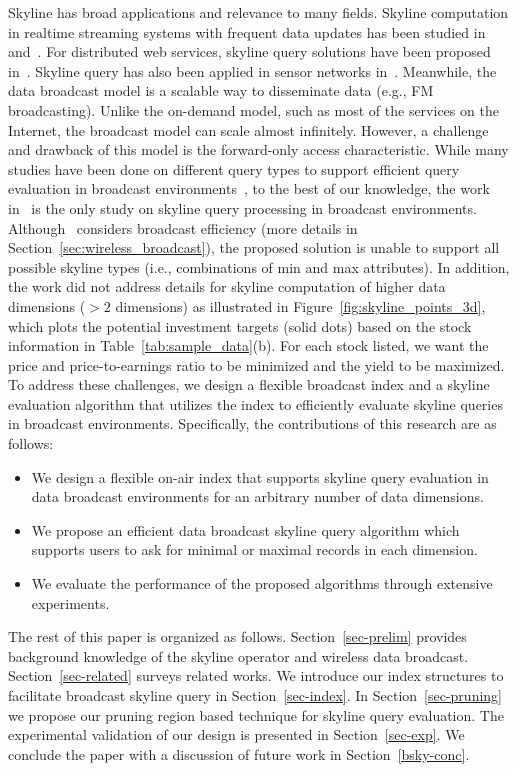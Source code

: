 Skyline has broad applications and relevance to many fields.
Skyline computation in realtime streaming systems with frequent
data updates has been studied in~\cite{conf/icde/LinYWL05}
and~\cite{journals/tkde/TaoP06}. For distributed web services,
skyline query solutions have been proposed
in~\cite{conf/edbt/BalkeGZ04}. Skyline query has also been applied
in sensor networks in~\cite{conf/cikm/ChenLY09}. Meanwhile, the
data broadcast model is a scalable way to disseminate data (e.g.,
FM broadcasting). Unlike the on-demand model, such as most of the
services on the Internet, the broadcast model can scale almost
infinitely. However, a challenge and drawback of this model is the
forward-only access characteristic. While many studies have been
done on different query types to support efficient query
evaluation in broadcast
environments~\cite{conf/dexa/HaKCL09,conf/icde/KuZW07,journals/tmc/KuZW08,
journals/vldb/ZhengLLLS09,conf/cikm/Hara02}, to the best of our
knowledge, the work in~\cite{conf/dexa/HaKCL09} is the only study
on skyline query processing in broadcast environments.
Although~\cite{conf/dexa/HaKCL09} considers broadcast efficiency
(more details in Section~\ref{sec:wireless_broadcast}), the
proposed solution is unable to support all possible skyline types
(i.e., combinations of min and max attributes). In addition, the
work did not address details for skyline computation of higher
data dimensions ($>2$ dimensions) as illustrated in
Figure~\ref{fig:skyline_points_3d}, which plots the potential
investment targets (solid dots) based on the stock information in
Table~\ref{tab:sample_data}(b). For each stock listed, we want the
price and price-to-earnings ratio to be minimized and the yield to
be maximized. To address these challenges, we design a flexible
broadcast index and a skyline evaluation algorithm that utilizes
the index to efficiently evaluate skyline queries in broadcast
environments. Specifically, the contributions of this research are
as follows:

\begin{itemize}
\item We design a flexible on-air index that supports skyline
query evaluation in data broadcast environments for an arbitrary
number of data dimensions.

\item We propose an efficient data broadcast skyline query
algorithm which supports users to ask for minimal or maximal
records in each dimension.

\item We evaluate the performance of the proposed algorithms
through extensive experiments.
\end{itemize}

The rest of this paper is organized as follows.
Section~\ref{sec-prelim} provides background knowledge of the
skyline operator and wireless data broadcast.
Section~\ref{sec-related} surveys related works. We introduce our
index structures to facilitate broadcast skyline query in
Section~\ref{sec-index}. In Section~\ref{sec-pruning} we propose
our pruning region based technique for skyline query evaluation.
The experimental validation of our design is presented in
Section~\ref{sec-exp}. We conclude the paper with a discussion of future work in
Section~\ref{bsky-conc}.
